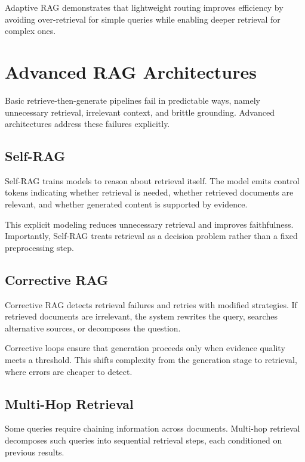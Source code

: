 Adaptive RAG \cite{adaptiverag} demonstrates that lightweight routing improves efficiency by avoiding over-retrieval for simple queries while enabling deeper retrieval for complex ones.

\section{Advanced RAG Architectures}

Basic retrieve-then-generate pipelines fail in predictable ways, namely unnecessary retrieval, irrelevant context, and brittle grounding. Advanced architectures address these failures explicitly.

\subsection{Self-RAG}

Self-RAG \cite{selfrag} trains models to reason about retrieval itself. The model emits control tokens indicating whether retrieval is needed, whether retrieved documents are relevant, and whether generated content is supported by evidence.

This explicit modeling reduces unnecessary retrieval and improves faithfulness. Importantly, Self-RAG treats retrieval as a decision problem rather than a fixed preprocessing step.

\subsection{Corrective RAG}

Corrective RAG \cite{crag} detects retrieval failures and retries with modified strategies. If retrieved documents are irrelevant, the system rewrites the query, searches alternative sources, or decomposes the question.

Corrective loops ensure that generation proceeds only when evidence quality meets a threshold. This shifts complexity from the generation stage to retrieval, where errors are cheaper to detect.

\subsection{Multi-Hop Retrieval}

Some queries require chaining information across documents. Multi-hop retrieval decomposes such queries into sequential retrieval steps, each conditioned on previous results.


